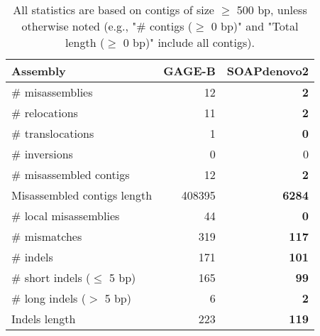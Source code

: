\documentclass[12pt,a4paper]{article}
\begin{document}
\begin{table}[ht]
\begin{center}
\caption{All statistics are based on contigs of size $\geq$ 500 bp, unless otherwise noted (e.g., "\# contigs ($\geq$ 0 bp)" and "Total length ($\geq$ 0 bp)" include all contigs).}
\begin{tabular}{|l*{2}{|r}|}
\hline
Assembly & GAGE-B & SOAPdenovo2 \\ \hline
\# misassemblies & 12 & {\bf 2} \\ \hline
\hspace{5mm}\# relocations & 11 & {\bf 2} \\ \hline
\hspace{5mm}\# translocations & 1 & {\bf 0} \\ \hline
\hspace{5mm}\# inversions & 0 & 0 \\ \hline
\# misassembled contigs & 12 & {\bf 2} \\ \hline
Misassembled contigs length & 408395 & {\bf 6284} \\ \hline
\# local misassemblies & 44 & {\bf 0} \\ \hline
\# mismatches & 319 & {\bf 117} \\ \hline
\# indels & 171 & {\bf 101} \\ \hline
\hspace{5mm}\# short indels ($\leq$ 5 bp) & 165 & {\bf 99} \\ \hline
\hspace{5mm}\# long indels ($>$ 5 bp) & 6 & {\bf 2} \\ \hline
Indels length & 223 & {\bf 119} \\ \hline
\end{tabular}
\end{center}
\end{table}
\end{document}
